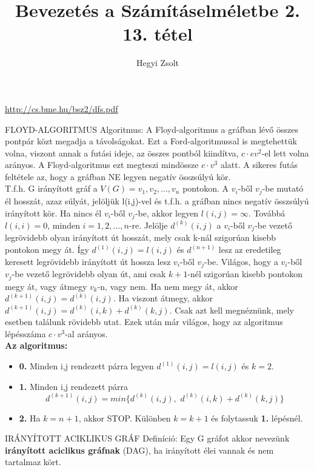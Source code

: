 \documentclass[]{article}
\title{Bevezetés a Számításelméletbe 2.\\{\large 13. tétel}}
\author{Hegyi Zsolt}
\begin{document}
\maketitle
\url{http://cs.bme.hu/bsz2/dfs.pdf}
\begin{framed}
FLOYD-ALGORITMUS Algoritmus: A Floyd-algoritmus a gráfban lévő összes pontpár közt megadja a távolságokat. Ezt a Ford-algoritmussal is megtehettük volna, viszont annak a futási ideje, az összes pontból kiindítva, $c\cdot ev^2$-el lett volna arányos. A Floyd-algoritmus ezt megteszi mindössze $c\cdot v^3$ alatt. A sikeres futás feltétele az, hogy a gráfban NE legyen negatív összsúlyú kör.\\
T.f.h. G irányított gráf a $V(G) = {v_1, v_2,..., v_n}$ pontokon. A $v_i$-ből $v_j$-be mutató él hosszát, azaz súlyát, jelöljük l(i,j)-vel és t.f.h. a gráfban nincs negatív összsúlyú irányított kör. Ha nincs él $v_i$-ből $v_j$-be, akkor legyen $l(i,j) = \infty$. Továbbá $l(i,i) = 0$, minden $i = 1, 2,..., n$-re. Jelölje $d^{(k)}(i,j)$ a $v_i$-ből $v_j$-be vezető legrövidebb olyan irányított út hosszát, mely csak k-nál szigorúan kisebb pontokon megy át. Így $d^{(1)}(i,j) = l(i,j)$ és $d^{(n+1)}$ lesz az eredetileg keresett legrövidebb irányított út hossza lesz $v_i$-ből $v_j$-be. Világos, hogy a $v_i$-ből $v_j$-be vezető legrövidebb olyan út, ami csak $k + 1$-nél szigorúan kisebb pontokon megy át, vagy átmegy $v_k$-n, vagy nem. Ha nem megy át, akkor $d^{(k+1)}(i,j) = d^{(k)}(i,j)$. Ha viszont átmegy, akkor $d^{(k+1)}(i,j) = d^{(k)}(i,k) + d^{(k)}(k,j)$. Csak azt kell megnéznünk, mely esetben találunk rövidebb utat. Ezek után már világos, hogy az algoritmus lépésszáma $c\cdot v^3$-al arányos.
\\
\textbf{Az algoritmus:}
\begin{itemize}
\item{\textbf{0.}} Minden i,j rendezett párra legyen $d^{(1)}(i,j) = l(i,j)$ és $k=2$.
\item{\textbf{1.}} Minden i,j rendezett párra
$$d^{(k+1)}(i,j) = min\{d^{(k)}(i,j),\,\, d^{(k)}(i,k) + d^{(k)}(k,j)\}$$
\item{\textbf{2.}} Ha $k = n + 1$, akkor STOP. Különben $k = k + 1$ és folytassuk \textbf{1.} lépésnél.
\end{itemize}
\end{framed}
\begin{shaded}
IRÁNYÍTOTT ACIKLIKUS GRÁF Definíció: Egy G gráfot akkor nevezünk \textbf{irányított aciclikus gráfnak} (DAG), ha irányított élei vannak és nem tartalmaz kört.
\end{shaded}
\end{document}
